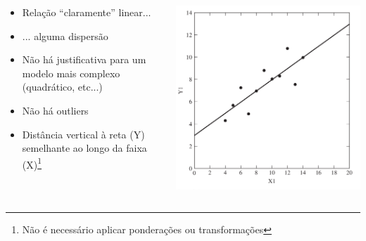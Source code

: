 \documentclass{beamer}
\begin{document}
\begin{frame}{}
  \begin{columns}
    \begin{column}{.5\textwidth}
      \begin{itemize}
        \tiny
      \item<2-4> Relação ``claramente'' linear...
      \item<2-4> ... alguma dispersão
      \item<4> Não há justificativa para um modelo mais complexo (quadrático, etc...)
      \item<5> Não há outliers
      \item<6> Distância vertical à reta (Y) semelhante ao longo da faixa (X)\footnote[frame]{\tiny Não é necessário aplicar ponderações ou transformações}
      \end{itemize}
    \end{column}
    \begin{column}{.5\textwidth}
      \begin{center}
        \includegraphics[width=\textwidth]{EDA/eda-dispersao1}
      \end{center}
    \end{column}
  \end{columns}
\end{frame}
\end{document}
